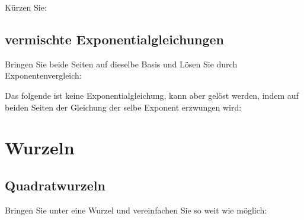 
\noTRAINER{\newpage}
\newpage
Kürzen Sie:


\newpage
\subsection{vermischte Exponentialgleichungen}
Bringen Sie beide Seiten auf dieselbe Basis und Lösen Sie durch
Exponentenvergleich:


\noTRAINER{\newpage}


Das folgende ist keine Exponentialgleichung, kann aber gelöst werden,
indem auf beiden Seiten der Gleichung der selbe Exponent erzwungen
wird:


\newpage
\section{Wurzeln}
\subsection{Quadratwurzeln}



\noTRAINER{\newpage}



Bringen Sie unter eine Wurzel und vereinfachen Sie so weit wie
möglich:

